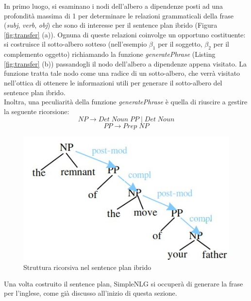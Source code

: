 In primo luogo, si esaminano i nodi dell'albero a dipendenze posti ad una profondità massima di 1 per determinare le relazioni grammaticali della frase (\textit{subj}, \textit{verb}, \textit{obj}) che sono di interesse per il sentence plan ibrido (Figura \ref{fig:transfer} (a)).
Ognuna di queste relazioni coinvolge un opportuno costituente: si costruisce il sotto-albero sotteso (nell'esempio $\beta_1$ per il soggetto, $\beta_2$ per il complemento oggetto) richiamando la funzione  \textit{generatePhrase} (Listing \ref{fig:transfer} (b)) passandogli il nodo dell'albero a dipendenze appena visitato. La funzione tratta tale nodo come una radice di un sotto-albero, che verrà visitato nell'ottica di ottenere le informazioni utili per generare il sotto-albero del sentence plan ibrido.
\\Inoltra, una peculiarità della funzione \textit{generatePhrase} è quella di riuscire a gestire la seguente ricorsione:
			\[ NP \longrightarrow Det \; Noun \;PP \; | \; Det \; Noun \]
			\[ PP \longrightarrow Prep \; NP  \]	
\begin{figure}[ht]
	\centering 
	\includegraphics[scale=0.5]{./img/ricorsione}
	\caption{Struttura ricorsiva nel sentence plan ibrido}
	\label{sentence_plan}
\end{figure}
Una volta costruito il sentence plan, SimpleNLG si occuperà di generare la frase per l'inglese, come già discusso all'inizio di questa sezione.

		
							






